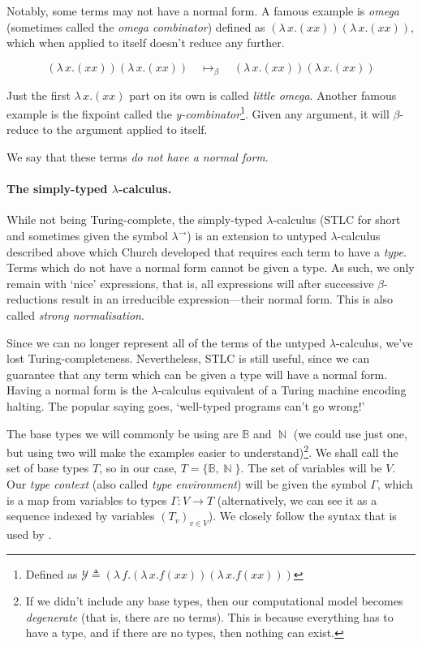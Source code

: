 \documentclass[logo,bsc,singlespacing,parskip,online]{infthesis}
\DeclareMathOperator{\nat}{\mathbb{N}}
\begin{document}
Notably, some terms may not have a normal form. A famous example is
\textit{omega} (sometimes called the \textit{omega combinator}) defined as
$(\lambda \, x. (x x)) (\lambda \, x. (x x))$, which when applied to itself
doesn't reduce any further.

\begin{equation*}
  (\lambda \, x. (x x)) (\lambda \, x. (x x)) \quad \mapsto_{\beta} \quad (\lambda \, x. (x x)) (\lambda \, x. (x x))
\end{equation*}

Just the first $\lambda \, x. (x x)$ part on its own is called \textit{little
omega}. Another famous example is the fixpoint called the
\textit{y-combinator}\footnote{Defined as $\mathcal{Y} \triangleq (\lambda \, f.
(\lambda \, x. f (x x )) (\lambda \, x. f (xx)))$}. Given any argument, it will
$\beta$-reduce to the argument applied to itself.

We say that these terms \textit{do not have a normal form}.

\paragraph*{The simply-typed $\lambda$-calculus.} While not being
Turing-complete, the simply-typed $\lambda$-calculus (STLC for short and
sometimes given the symbol $\lambda^{\rightarrow}$) is an extension to untyped
$\lambda$-calculus described above which Church developed that requires each
term to have a \textit{type}. Terms which do not have a normal form cannot be
given a type. As such, we only remain with `nice' expressions, that is, all
expressions will after successive $\beta$-reductions result in an irreducible
expression---their normal form. This is also called \textit{strong
normalisation}. \citep{pierce_types_2002}

Since we can no longer represent all of the terms of the untyped
$\lambda$-calculus, we've lost Turing-completeness. Nevertheless, STLC is still
useful, since we can guarantee that any term which can be given a type will have
a normal form. Having a normal form is the $\lambda$-calculus equivalent of a
Turing machine encoding halting. The popular saying goes, `well-typed programs
can't go wrong!' \citep{milner_theory_1978}

The base types we will commonly be using are $\mathbb{B}$ and $\nat$ (we could
use just one, but using two will make the examples easier to
understand)\footnote{If we didn't include any base types, then our computational
model becomes \textit{degenerate} (that is, there are no terms). This is because
everything has to have a type, and if there are no types, then nothing can
exist.}. We shall call the set of base types $T$, so in our case, $T = \{
\mathbb{B} , \nat \}$. The set of variables will be $V$. Our \textit{type
context} (also called \textit{type environment}) will be given the symbol
$\Gamma$, which is a map from variables to types $\Gamma \colon V \to T$
(alternatively, we can see it as a sequence indexed by variables $(T_v)_{v \in
V}$). We closely follow the syntax that is used by \citet{pierce_types_2002}.
\end{document}

